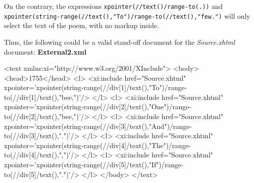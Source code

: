 On the contrary, the expressions \texttt{xpointer(//text()/range-to(.))} and \texttt{xpointer(string-range(//text(),"To")/range-to(//text(),"few.")} will only select the text of the poem, with no markup inside.\par
Thus, the following could be a valid stand-off document for the \textit{Source.xhtml} document: \mbox{}\newline 
  \textbf{External2.xml} \par\hfill\bgroup\exampleFont\vskip 10pt\begin{shaded}
\obeyspaces <text xmlns:xi="http://www.w3.org/2001/XInclude">\newline
 <body>\newline
  <head>1755</head>\newline
  <l>\newline
   <xi:include href="Source.xhtml"\newline
 xpointer='xpointer(string-range(//div[1]/text(),"To")/range-to(//div[1]/text(),"bee,")'/>\newline
  </l>\newline
  <l>\newline
   <xi:include href="Source.xhtml"\newline
 xpointer='xpointer(string-range(//div[2]/text(),"One")/range-to(//div[2]/text(),"bee,")'/>\newline
  </l>\newline
  <l>\newline
   <xi:include href="Source.xhtml"\newline
 xpointer='xpointer(string-range(//div[3]/text(),"And")/range-to(//div[3]/text(),".")'/>\newline
  </l>\newline
  <l>\newline
   <xi:include href="Source.xhtml"\newline
 xpointer='xpointer(string-range(//div[4]/text(),"The")/range-to(//div[4]/text(),",")'/>\newline
  </l>\newline
  <l>\newline
   <xi:include href="Source.xhtml"\newline
 xpointer='xpointer(string-range(//div[5]/text(),"If")/range-to(//div[5]/text(),".")'/>\newline
  </l>\newline
 </body>\newline
</text>\end{shaded}
\par\egroup 

